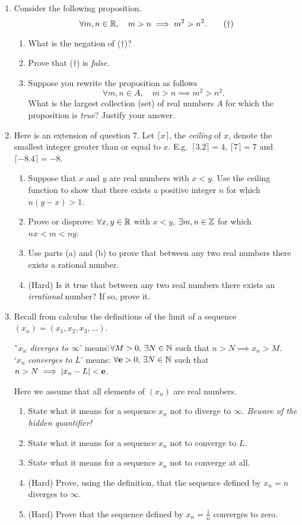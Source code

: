 \begin{exercises}{}{}
\begin{enumerate}
	  \item Consider the following proposition.
	\[\forall m,n\in\mathbb{R},\quad m>n\implies m^2>n^2.\tag*{($\dag$)}\]
	\begin{enumerate}
  	\item What is the negation of ($\dag$)?
  	\item Prove that ($\dag$) is \emph{false.}
  	\item Suppose you rewrite the proposition as follows
  	\[\forall m,n\in A,\quad m>n\implies m^2>n^2.\]
  	What is the largest collection (set) of real numbers $A$ for which the proposition is \emph{true}? Justify your answer.
	\end{enumerate}
	
	\item Here is an extension of question 7. Let $\lceil x\rceil$, the \emph{ceiling} of $x$, denote the smallest integer greater than or equal to $x$. E.g.\ $\lceil 3.2\rceil=4$, $\lceil 7\rceil=7$ and $\lceil -8.4\rceil=-8$.
	\begin{enumerate}
  	\item Suppose that $x$ and $y$ are real numbers with $x<y$. Use the ceiling function to show that there exists a positive integer $n$ for which $n(y-x)>1$.
  	\item Prove or disprove: $\forall x,y\in\mathbb{R}$ with $x<y$, $\exists m,n\in\mathbb{Z}$ for which $nx<m<ny$.
  	\item Use parts (a) and (b) to prove that between any two real numbers there exists a rational number.
  	\item (Hard) Is it true that between any two real numbers there exists an \emph{irrational} number? If so, prove it.
	\end{enumerate}
	
	\item Recall from calculus the definitions of the limit of a sequence $(x_n)=(x_1,x_2,x_3,\ldots)$.
	\begin{tabbing}
	  \=`$x_n$ \emph{diverges to $\infty$}' means:\qquad\qquad \=$\forall M>0,\,\exists N\in\mathbb{N}$ such that $n>N\implies x_n>M$.\\[5pt]
	  \>`$x_n$ \emph{converges to $L$}' means: \>$\forall{\mathbf{e}}>0,\,\exists N\in\mathbb{N}$ such that $n>N\implies \left| x_n-L\right|<{\mathbf{e}}$.
	\end{tabbing}
	Here we assume that all elements of $(x_n)$ are real numbers.
	\begin{enumerate}
	  \item State what it means for a sequence $x_n$ not to diverge to $\infty$. \emph{Beware of the hidden quantifier!}
	  \item State what it means for a sequence $x_n$ not to converge to $L$.
	  \item State what it means for a sequence $x_n$ not to converge at all.
	  \item (Hard) Prove, using the definition, that the sequence defined by $x_n=n$ diverges to $\infty$.
	  \item (Hard) Prove that the sequence defined by $x_n=\frac 1n$ converges to zero.
	\end{enumerate}
	

\end{enumerate}
\end{exercises}
